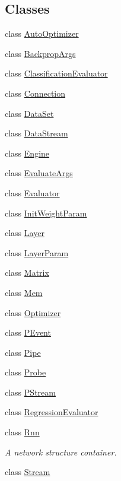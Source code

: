 \subsection*{Classes}
\begin{DoxyCompactItemize}
\item 
class \hyperlink{classfractal_1_1AutoOptimizer}{Auto\+Optimizer}
\item 
class \hyperlink{classfractal_1_1BackpropArgs}{Backprop\+Args}
\item 
class \hyperlink{classfractal_1_1ClassificationEvaluator}{Classification\+Evaluator}
\item 
class \hyperlink{classfractal_1_1Connection}{Connection}
\item 
class \hyperlink{classfractal_1_1DataSet}{Data\+Set}
\item 
class \hyperlink{classfractal_1_1DataStream}{Data\+Stream}
\item 
class \hyperlink{classfractal_1_1Engine}{Engine}
\item 
class \hyperlink{classfractal_1_1EvaluateArgs}{Evaluate\+Args}
\item 
class \hyperlink{classfractal_1_1Evaluator}{Evaluator}
\item 
class \hyperlink{classfractal_1_1InitWeightParam}{Init\+Weight\+Param}
\item 
class \hyperlink{classfractal_1_1Layer}{Layer}
\item 
class \hyperlink{classfractal_1_1LayerParam}{Layer\+Param}
\item 
class \hyperlink{classfractal_1_1Matrix}{Matrix}
\item 
class \hyperlink{classfractal_1_1Mem}{Mem}
\item 
class \hyperlink{classfractal_1_1Optimizer}{Optimizer}
\item 
class \hyperlink{classfractal_1_1PEvent}{P\+Event}
\item 
class \hyperlink{classfractal_1_1Pipe}{Pipe}
\item 
class \hyperlink{classfractal_1_1Probe}{Probe}
\item 
class \hyperlink{classfractal_1_1PStream}{P\+Stream}
\item 
class \hyperlink{classfractal_1_1RegressionEvaluator}{Regression\+Evaluator}
\item 
class \hyperlink{classfractal_1_1Rnn}{Rnn}
\begin{DoxyCompactList}\small\item\em A network structure container. \end{DoxyCompactList}\item 
class \hyperlink{classfractal_1_1Stream}{Stream}
\end{DoxyCompactItemize}
